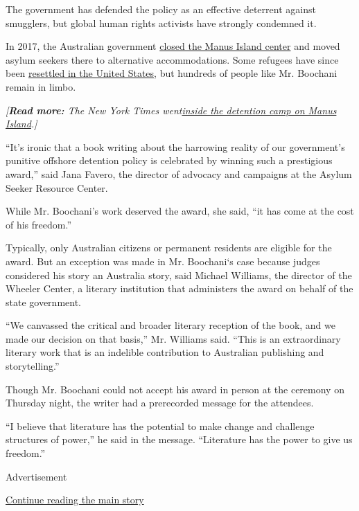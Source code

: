 The government has defended the policy as an effective deterrent against
smugglers, but global human rights activists have strongly condemned it.

In 2017, the Australian government
\href{https://www.nytimes3xbfgragh.onion/2017/11/02/world/australia/manus-island-refugees.html}{closed
the Manus Island center} and moved asylum seekers there to alternative
accommodations. Some refugees have since been
\href{https://www.nytimes3xbfgragh.onion/2018/01/23/world/australia/manus-refugees-trump.html}{resettled
in the United States}, but hundreds of people like Mr. Boochani remain
in limbo.

\emph{{[}\emph{\emph{\textbf{Read more:}} \emph{The New York Times
went}\href{https://www.nytimes3xbfgragh.onion/interactive/2017/11/18/world/australia/manus-island-australia-detainees.html}{\emph{inside
the detention camp on Manus Island}}}.{]}}

``It's ironic that a book writing about the harrowing reality of our
government's punitive offshore detention policy is celebrated by winning
such a prestigious award,'' said Jana Favero, the director of advocacy
and campaigns at the Asylum Seeker Resource Center.

While Mr. Boochani's work deserved the award, she said, ``it has come at
the cost of his freedom.''

Typically, only Australian citizens or permanent residents are eligible
for the award. But an exception was made in Mr. Boochani`s case because
judges considered his story an Australia story, said Michael Williams,
the director of the Wheeler Center, a literary institution that
administers the award on behalf of the state government.

``We canvassed the critical and broader literary reception of the book,
and we made our decision on that basis,'' Mr. Williams said. ``This is
an extraordinary literary work that is an indelible contribution to
Australian publishing and storytelling.''

Though Mr. Boochani could not accept his award in person at the ceremony
on Thursday night, the writer had a prerecorded message for the
attendees.

``I believe that literature has the potential to make change and
challenge structures of power,'' he said in the message. ``Literature
has the power to give us freedom.''

Advertisement

\protect\hyperlink{after-bottom}{Continue reading the main story}

